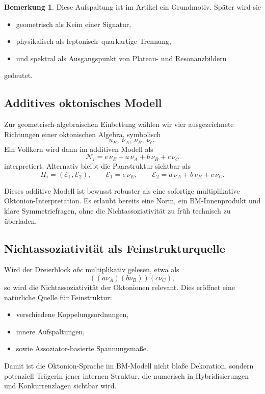 \documentclass[11pt,a4paper]{article}
\theoremstyle{definition}
\newtheorem{bemerkung}[definition]{Bemerkung}
\theoremstyle{plain}
\begin{document}
	\begin{bemerkung}
		Diese Aufspaltung ist im Artikel ein Grundmotiv. Später wird sie
		\begin{itemize}[leftmargin=2em]
			\item geometrisch als Keim einer Signatur,
			\item physikalisch als leptonisch--quarkartige Trennung,
			\item und spektral als Ausgangspunkt von Plateau- und Resonanzbildern
		\end{itemize}
		gedeutet.
	\end{bemerkung}
	
	\subsection{Additives oktonisches Modell}
	
	Zur geometrisch-algebraischen Einbettung wählen wir vier ausgezeichnete Richtungen einer oktonischen Algebra, symbolisch
	\[
	u_E,\ \nu_A,\ \nu_B,\ \nu_C.
	\]
	Ein Vollkern wird dann im additiven Modell als
	\[
	\mathcal N_i = e\,\nu_E + a\,\nu_A + b\,\nu_B + c\,\nu_C
	\]
	interpretiert. Alternativ bleibt die Paarstruktur sichtbar als
	\[
	\Pi_i=(\mathcal E_1,\mathcal E_2),
	\qquad
	\mathcal E_1=e\,\nu_E,
	\qquad
	\mathcal E_2=a\,\nu_A+b\,\nu_B+c\,\nu_C.
	\]
	
	Dieses additive Modell ist bewusst robuster als eine sofortige multiplikative Oktonion-Interpretation. Es erlaubt bereits eine Norm, ein BM-Innenprodukt und klare Symmetriefragen, ohne die Nichtassoziativität zu früh technisch zu überladen.
	
	\subsection{Nichtassoziativität als Feinstrukturquelle}
	
	Wird der Dreierblock $abc$ multiplikativ gelesen, etwa als
	\[
	((a\nu_A)(b\nu_B))(c\nu_C),
	\]
	so wird die Nichtassoziativität der Oktonionen relevant. Dies eröffnet eine natürliche Quelle für Feinstruktur:
	\begin{itemize}[leftmargin=2em]
		\item verschiedene Koppelungsordnungen,
		\item innere Aufspaltungen,
		\item sowie Assoziator-basierte Spannungsmaße.
	\end{itemize}
	
	Damit ist die Oktonion-Sprache im BM-Modell nicht bloße Dekoration, sondern potenziell Trägerin jener internen Struktur, die numerisch in Hybridisierungen und Konkurrenzlagen sichtbar wird.
	
\end{document}
